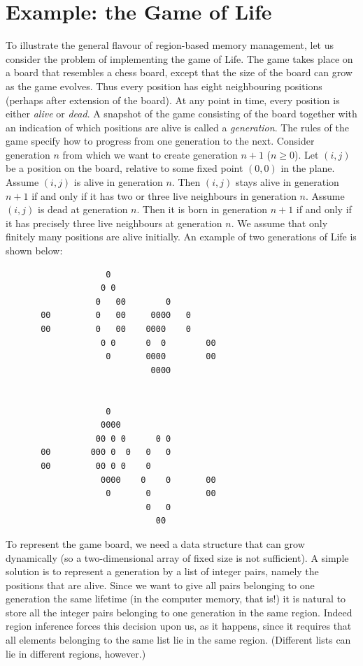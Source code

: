 \documentclass[12pt]{book}
\begin{document}
\section{Example: the Game of Life}
\label{life.sec}
%
To illustrate the general flavour of region-based memory management,
let us consider the problem of implementing the game of Life. The game
takes place on a board that resembles a chess board, except that the
size of the board can grow as the game evolves. Thus every position
has eight neighbouring positions (perhaps after extension of the
board).  At any point in time, every position is either {\em alive} or
{\em dead}. A snapshot of the game consisting of the board together
with an indication of which positions are alive is called a {\em
  generation}. The rules of the game specify how to progress from one
generation to the next. Consider generation $n$ from which we want to
create generation $n+1$ ($n\geq0$). Let $(i,j)$ be a position on the
board, relative to some fixed point $(0,0)$ in the plane. Assume
$(i,j)$ is alive in generation $n$. Then $(i,j)$ stays alive in
generation $n+1$ if and only if it has two or three live neighbours in
generation $n$. Assume $(i,j)$ is dead at generation $n$. Then it is
born in generation $n+1$ if and only if it has precisely three live
neighbours at generation $n$. We assume that only finitely many
positions are alive initially. An example of two generations of Life
is shown below:
\begin{verbatim}
                    0
                   0 0
                  0   00        0
       00         0   00     0000   0
       00         0   00    0000    0
                   0 0      0  0        00
                    0       0000        00
                             0000


                    0
                   0000
                  00 0 0      0 0
       00        000 0  0   0   0
       00         00 0 0    0
                   0000    0    0       00
                    0       0           00
                            0   0
                              00
\end{verbatim}

To represent the game board, we need a data structure that can grow
dynamically (so a two-dimensional array of fixed size is not
sufficient).  A simple solution is to represent a generation by a list
of integer pairs, namely the positions that are alive. Since we want
to give all pairs belonging to one generation the same lifetime (in
the computer memory, that is!)  it is natural to store all the integer
pairs belonging to one generation in the same region. Indeed region
inference forces this decision upon us, as it happens, since it
requires that all elements belonging to the same list lie in the same
region. (Different lists can lie in different regions, however.)
\end{document}
